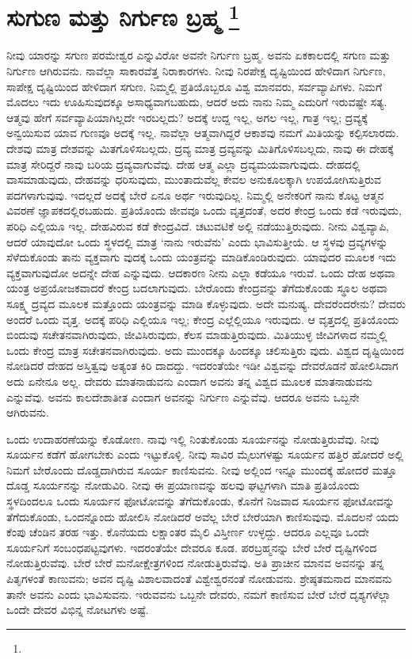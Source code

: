 
\chapter[ಸುಗುಣ ಮತ್ತು ನಿರ್ಗುಣ ಬ್ರಹ್ಮ ]{ಸುಗುಣ ಮತ್ತು ನಿರ್ಗುಣ ಬ್ರಹ್ಮ \protect\footnote{}}

ನೀವು ಯಾರನ್ನು ಸಗುಣ ಪರಮೇಶ್ವರ ಎನ್ನುವಿರೋ ಅವನೇ ನಿರ್ಗುಣ ಬ್ರಹ್ಮ. ಅವನು ಏಕಕಾಲದಲ್ಲಿ ಸಗುಣ ಮತ್ತು ನಿರ್ಗುಣ ಆಗಿರುವನು. ನಾವೆಲ್ಲಾ ಸಾಕಾರವೆತ್ತ ನಿರಾಕಾರಗಳು. ನೀವು ನಿರಪೇಕ್ಷ ದೃಷ್ಟಿಯಿಂದ ಹೇಳಿದಾಗ ನಿರ್ಗುಣ, ಸಾಪೇಕ್ಷ ದೃಷ್ಟಿಯಿಂದ ಹೇಳಿದಾಗ ಸಗುಣ. ನಿಮ್ಮಲ್ಲಿ ಪ್ರತಿಯೊಬ್ಬರೂ ವಿಶ್ವ ಮಾನವರು, ಸರ್ವವ್ಯಾಪಿಗಳು. ನಿಮಗೆ ಮೊದಲು ಇದು ಊಹಿಸುವುದಕ್ಕೂ ಅಸಾಧ್ಯವಾಗಬಹುದು, ಆದರೆ ಅದು ನಾನು ನಿಮ್ಮ ಎದುರಿಗೆ ಇರುವಷ್ಟೇ ಸತ್ಯ. ಆತ್ಮವು ಹೇಗೆ ಸರ್ವವ್ಯಾಪಿಯಾಗಿಲ್ಲದೇ ಇರಬಲ್ಲದು? ಅದಕ್ಕೆ ಉದ್ದ ಇಲ್ಲ, ಅಗಲ ಇಲ್ಲ, ಗಾತ್ರ ಇಲ್ಲ; ದ್ರವ್ಯಕ್ಕೆ ಅನ್ವಯಿಸುವ ಯಾವ ಗುಣವೂ ಅದಕ್ಕೆ ಇಲ್ಲ. ನಾವೆಲ್ಲಾ ಆತ್ಮವಾಗಿದ್ದರೆ ಆಕಾಶವು ನಮಗೆ ಮಿತಿಯನ್ನು ಕಲ್ಪಿಸಲಾರದು. ದೇಶವು ಮಾತ್ರ ದೇಶವನ್ನು ಮಿತಗೊಳಿಸಬಲ್ಲದು, ದ್ರವ್ಯ ಮಾತ್ರ ದ್ರವ್ಯವನ್ನು ಮಿತಿಗೊಳಿಸಬಲ್ಲದು, ನಾವು ಈ ದೇಹಕ್ಕೆ ಮಾತ್ರ ಸೇರಿದ್ದರೆ ನಾವು ಬರಿಯ ದ್ರವ್ಯವಾಗುವೆವು. ದೇಹ ಆತ್ಮ ಎಲ್ಲಾ ದ್ರವ್ಯಮಯವಾಗುವುದು. ದೇಹದಲ್ಲಿ ವಾಸಮಾಡುವುದು, ದೇಹವನ್ನು ಧರಿಸುವುದು, ಮುಂತಾದುವೆಲ್ಲ ಕೇವಲ ಅನುಕೂಲಕ್ಕಾಗಿ ಉಪಯೋಗಿಸುತ್ತಿರುವ ಪದಗಳಾಗುವುವು. ಇದಲ್ಲದೆ ಅದಕ್ಕೆ ಬೇರೆ ಏನೂ ಅರ್ಥ ಇರುವುದಿಲ್ಲ. ನಿಮ್ಮಲ್ಲಿ ಅನೇಕರಿಗೆ ನಾನು ಕೊಟ್ಟ ಆತ್ಮನ ವಿವರಣೆ ಜ್ಞಾಪಕದಲ್ಲಿರಬಹುದು. ಪ್ರತಿಯೊಂದು ಜೀವವೂ ಒಂದು ವೃತ್ತದಂತೆ, ಅದರ ಕೇಂದ್ರ ಒಂದು ಕಡೆ ಇರುವುದು, ಪರಿಧಿ ಎಲ್ಲಿಯೂ ಇಲ್ಲ. ದೇಹವಿರುವ ಕಡೆ ಕೇಂದ್ರವಿದೆ. ಚಟುವಟಿಕೆ ಅಲ್ಲಿ ನಡೆಯುತ್ತಿರುವುದು. ನೀನು ವಿಶ್ವವ್ಯಾಪಿ, ಆದರೆ ಯಾವುದೋ ಒಂದು ಸ್ಥಳದಲ್ಲಿ ಮಾತ್ರ ‘ನಾನು ಇರುವೆನು’ ಎಂದು ಭಾವಿಸುತ್ತೀಯೆ. ಆ ಸ್ಥಳವು ದ್ರವ್ಯಗಳನ್ನು ಸೆಳೆದುಕೊಂಡು ತಾನು ವ್ಯಕ್ತವಾಗು ವುದಕ್ಕೆ ಒಂದು ಯಂತ್ರವನ್ನು ಮಾಡಿಕೊಂಡಿರುವುದು. ಯಾವುದರ ಮೂಲಕ ಇದು ವ್ಯಕ್ತವಾಗುವುದೋ ಅದನ್ನೇ ದೇಹ ಎನ್ನುವುದು. ಆದಕಾರಣ ನೀನು ಎಲ್ಲಾ ಕಡೆಯೂ ಇರುವೆ. ಒಂದು ದೇಹ ಅಥವಾ ಯಂತ್ರ ಅಪ್ರಯೋಜಕವಾದರೆ ಕೇಂದ್ರ ಬದಲಾಗುವುದು. ಬೇರೊಂದು ಕೇಂದ್ರವನ್ನು ತೆಗೆದುಕೊಂಡು ಸ್ಥೂಲ ಅಥವಾ ಸೂಕ್ಷ್ಮ ದ್ರವ್ಯದ ಮೂಲಕ ಮತ್ತೊಂದು ಯಂತ್ರವನ್ನು ಮಾಡಿ ಕೊಳ್ಳುವುದು. ಅದೇ ಮನುಷ್ಯ. ದೇವರೆಂದರೇನು? ದೇವರು ಅಂದರೆ ಒಂದು ವೃತ್ತ. ಅದಕ್ಕೆ ಪರಿಧಿ ಎಲ್ಲಿಯೂ ಇಲ್ಲ; ಕೇಂದ್ರ ಎಲ್ಲೆಲ್ಲಿಯೂ ಇರುವುದು. ಆ ವೃತ್ತದಲ್ಲಿ ಪ್ರತಿಯೊಂದು ಬಿಂದುವು ಸಚೇತನವಾಗಿರುವುದು, ಜೀವಿಸಿರುವುದು, ಕೆಲಸ ಮಾಡುತ್ತಿರುವುದು. ಮಿತಿಯುಳ್ಳ ಜೀವಿಗಳಾದ ನಮ್ಮಲ್ಲಿ ಒಂದು ಕೇಂದ್ರ ಮಾತ್ರ ಸಚೇತನವಾಗಿರುವುದು. ಅದು ಮುಂದಕ್ಕೂ ಹಿಂದಕ್ಕೂ ಚಲಿಸುತ್ತಿರು ವುದು. ವಿಶ್ವದ ದೃಷ್ಟಿಯಿಂದ ನೋಡಿದರೆ ದೇಹದ ಅಸ್ತಿತ್ವವು ಅತ್ಯಂತ ಕಿರಿ ದಾದದ್ದು. ಇದರಂತೆಯೇ ಇಡೀ ವಿಶ್ವವನ್ನು ದೇವರೊಡನೆ ಹೋಲಿಸಿದಾಗ ಅದು ಏನೇನೂ ಅಲ್ಲ. ದೇವರು ಮಾತನಾಡುವನು ಎಂದಾಗ ಅವನು ತನ್ನ ವಿಶ್ವದ ಮೂಲಕ ಮಾತನಾಡುವನು ಎನ್ನುವೆವು. ಅವನು ಕಾಲದೇಶಾತೀತ ಎಂದಾಗ ಅವನನ್ನು ನಿರ್ಗುಣ ಎನ್ನುವೆವು. ಆದರೂ ಅವನು ಒಬ್ಬನೇ ಆಗಿರುವನು.

ಒಂದು ಉದಾಹರಣೆಯನ್ನು ಕೊಡೋಣ. ನಾವು ಇಲ್ಲಿ ನಿಂತುಕೊಂಡು ಸೂರ್ಯನನ್ನು ನೋಡುತ್ತಿರುವೆವು. ನೀವು ಸೂರ್ಯನ ಕಡೆಗೆ ಹೋಗಬೇಕು ಎಂದು ಇಟ್ಟುಕೊಳ್ಳಿ. ನೀವು ಸಾವಿರ ಮೈಲುಗಳಷ್ಟು ಸೂರ್ಯನ ಹತ್ತಿರ ಹೋದರೆ ಅಲ್ಲಿ ನಿಮಗೆ ಬೇರೊಂದು ದೊಡ್ಡದಾಗಿರುವ ಸೂರ್ಯ ಕಾಣಿಸುವನು. ನೀವು ಅಲ್ಲಿಂದ ಇನ್ನೂ ಮುಂದಕ್ಕೆ ಹೋದರೆ ಮತ್ತೂ ದೊಡ್ಡ ಸೂರ್ಯನನ್ನು ನೋಡುವಿರಿ. ನೀವು ಈ ಪ್ರಯಾಣವನ್ನು ಹಲವು ಘಟ್ಟಗಳಾಗಿ ಮಾತಿ ಪ್ರತಿಯೊಂದು ಸ್ಥಳದಿಂದಲೂ ಒಂದು ಸೂರ್ಯನ ಫೋಟೋವನ್ನು ತೆಗೆದುಕೊಂಡು, ಕೊನೆಗೆ ನಿಜವಾದ ಸೂರ್ಯನ ಫೋಟೋವನ್ನು ತೆಗೆದುಕೊಂಡು, ಒಂದನ್ನೊಂದು ಹೋಲಿಸಿ ನೋಡಿದರೆ ಅವೆಲ್ಲ ಬೇರೆ ಬೇರೆಯಾಗಿ ಕಾಣಿಸುವುವು. ಮೊದಲನೆ ಯದು ಕೆಂಪು ಚೆಂಡಿನ ತರಹ ಇತ್ತು. ಕೊನೆಯದು ಲಕ್ಷಾಂತರ ಮೈಲಿ ವಿಸ್ತೀರ್ಣ ಉಳ್ಳದ್ದು. ಆದರೂ ಎಲ್ಲವೂ ಒಂದೇ ಸೂರ್ಯನಿಗೆ ಸಂಬಂಧಪಟ್ಟವುಗಳು. ಇದರಂತೆಯೇ ದೇವರೂ ಕೂಡ. ಪರಬ್ರಹ್ಮನನ್ನು ಬೇರೆ ಬೇರೆ ದೃಷ್ಟಿಗಳಿಂದ ನೋಡುತ್ತಿರುವೆವು. ಬೇರೆ ಬೇರೆ ಮನೋಕ್ಷೇತ್ರಗಳಿಂದ ನೋಡುತ್ತಿರುವೆವು. ಅತಿ ಪ್ರಾಚೀನ ಮಾನವ ಅವನನ್ನು ತನ್ನ ಪಿತೃಗಳಂತೆ ಕಾಣುವನು; ಅವನ ದೃಷ್ಟಿ ವಿಶಾಲವಾದಂತೆ ವಿಶ್ವೇಶ್ವರನಂತೆ ನೋಡುವನು. ಶ್ರೇಷ್ಠತಮನಾದ ಮಾನವನು ತಾನೇ ಅವನು ಎಂದು ಭಾವಿಸುವನು. ಇರುವವನು ಒಬ್ಬನೇ ದೇವರು, ನಮಗೆ ಕಾಣಿಸುವ ಬೇರೆ ಬೇರೆ ದೃಶ್ಯಗಳೆಲ್ಲಾ ಒಂದೇ ದೇವರ ವಿಭಿನ್ನ ನೋಟಗಳು ಅಷ್ಟೆ.

